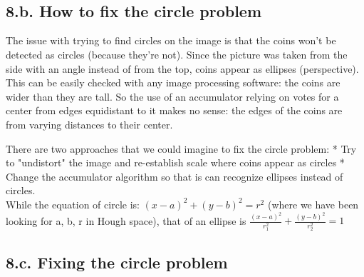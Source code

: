 \documentclass[11pt]{article}
\begin{document}
    \begin{center}
    \end{center}
    { \hspace*{\fill} \\}
    
    \begin{center}
    \end{center}
    { \hspace*{\fill} \\}
    
    \subsection{8.b. How to fix the circle
problem}\label{b.-how-to-fix-the-circle-problem}

    The issue with trying to find circles on the image is that the coins
won't be detected as circles (because they're not). Since the picture
was taken from the side with an angle instead of from the top, coins
appear as ellipses (perspective). This can be easily checked with any
image processing software: the coins are wider than they are tall. So
the use of an accumulator relying on votes for a center from edges
equidistant to it makes no sense: the edges of the coins are from
varying distances to their center.

There are two approaches that we could imagine to fix the circle
problem: * Try to "undistort" the image and re-establish scale where
coins appear as circles * Change the accumulator algorithm so that is
can recognize ellipses instead of circles.\\
While the equation of circle is: \((x-a)^2 + (y-b)^2 = r^2\) (where we
have been looking for a, b, r in Hough space), that of an ellipse is
\(\frac{(x-a)^2}{r_1^2} + \frac{(y-b)^2}{r_2^2} = 1\)

    \subsection{8.c. Fixing the circle
problem}\label{c.-fixing-the-circle-problem}
\end{document}
